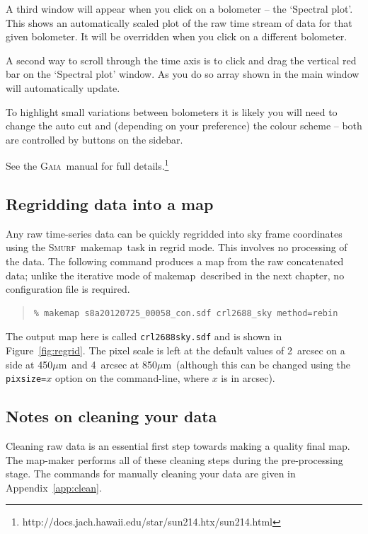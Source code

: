 \documentclass[twoside,11pt]{article}
\newcommand{\xref}[3]{#1}
\newcommand{\xlabel}[1]{}
\renewcommand{\_}{\texttt{\symbol{95}}}
\newcommand{\micron}{\mbox{$\mu$m}}
\newenvironment{myquote}{\begin{quote}\begin{small}}{\end{small}\end{quote}}
\newcommand{\gaia}{\xref{\textsc{Gaia}}{sun214}{}}
\newcommand{\smurf}{\xref{\textsc{Smurf}}{sun258}{}}
\newcommand{\task}[1]{\textsf{#1}}
\newcommand{\makemap}{\xref{\task{makemap}}{sun258}{MAKEMAP}}
\begin{document}
A third window will appear when you click on a bolometer -- the
`Spectral plot'. This shows an automatically scaled plot of the raw
time stream of data for that given bolometer. It will be overridden
when you click on a different bolometer.

A second way to scroll through the time axis is to click and drag the
vertical red bar on the `Spectral plot' window. As you do so array
shown in the main window will automatically update.

To highlight small variations between bolometers it is likely you will
need to change the auto cut and (depending on your preference) the
colour scheme -- both are controlled by buttons on the sidebar.

See the \xref{\gaia\ manual}{sun214}{} for full
details.\footnote{http://docs.jach.hawaii.edu/star/sun214.htx/sun214.html}

\clearpage
\subsection{\xlabel{regrid_map}Regridding data into a map}
\label{sec:regrid}

Any raw time-series data can be quickly regridded into sky frame
coordinates using the \smurf\ \makemap\ task in regrid mode. This
involves no processing of the data. The following command produces a
map from the raw concatenated data; unlike the iterative mode of
\makemap\ described in the next chapter, no configuration file is
required.
\begin{myquote}
\begin{verbatim}
% makemap s8a20120725_00058_con.sdf crl2688_sky method=rebin
\end{verbatim}
\end{myquote}
The output map here is called \texttt{crl2688\_sky.sdf} and is shown
in Figure~\ref{fig:regrid}.
The pixel scale is left at the default values of 2~arcsec on a side at
450\micron\ and 4~arcsec at 850\micron\ (although this can be changed
using the \texttt{pixsize=}$x$ option on the command-line, where $x$ is in
arcsec).

\subsection{\xlabel{clean}Notes on cleaning your data}
\label{sec:clean}
Cleaning raw data is an essential first step towards making a quality
final map. The map-maker performs all of these cleaning steps during
the pre-processing stage. The commands for manually cleaning your data
are given in Appendix~\ref{app:clean}.
\end{document}
